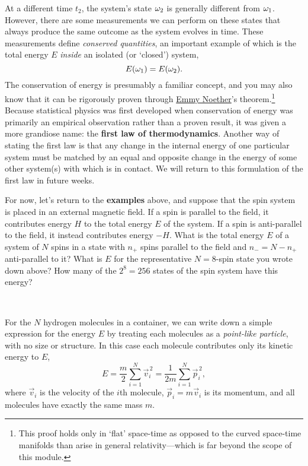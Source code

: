 At a different time $t_2$, the system's state $\omega_2$ is generally different from $\omega_1$.
However, there are some measurements we can perform on these states that always produce the same outcome as the system evolves in time.
These measurements define \textit{conserved quantities}, an important example of which is the total energy $E$ \textit{inside} an isolated (or `closed') system,
\begin{equation*}
  E(\omega_1) = E(\omega_2).
\end{equation*}
The conservation of energy is presumably a familiar concept, and you may also know that it can be rigorously proven through \href{https://en.wikipedia.org/wiki/Emmy_Noether}{Emmy Noether}'s theorem.\footnote{This proof holds only in `flat' space-time as opposed to the curved space-time manifolds than arise in general relativity---which is far beyond the scope of this module.}
Because statistical physics was first developed when conservation of energy was primarily an empirical observation rather than a proven result, it was given a more grandiose name: the \textbf{first law of thermodynamics}.
Another way of stating the first law is that any change in the internal energy of one particular system \Om must be matched by an equal and opposite change in the energy of some other system(s) with which \Om is in contact.
We will return to this formulation of the first law in future weeks.

For now, let's return to the \textbf{examples} above, and suppose that the spin system is placed in an external magnetic field.
If a spin is parallel to the field, it contributes energy $H$ to the total energy $E$ of the system.
If a spin is anti-parallel to the field, it instead contributes energy $-H$.
What is the total energy $E$ of a system of $N$ spins in a state with $n_+$ spins parallel to the field and $n_- = N - n_+$ anti-parallel to it?
What is $E$ for the representative $N = 8$-spin state you wrote down above?
How many of the $2^8 = 256$ states of the spin system have this energy?
\begin{mdframed}
  \ \\[100 pt]
\end{mdframed}
For the $N$ hydrogen molecules in a container, we can write down a simple expression for the energy $E$ by treating each molecules as a \textit{point-like particle}, with no size or structure.
In this case each molecule contributes only its kinetic energy to $E$,
\begin{equation*}
  E = \frac{m}{2} \sum_{i = 1}^N \vec{v}_i^{\,2} = \frac{1}{2m} \sum_{i = 1}^N \vec{p}_i^{\,2},
\end{equation*}
where $\vec v_i$ is the velocity of the $i$th molecule, $\vec p_i = m \vec v_i$ is its momentum, and all molecules have exactly the same mass $m$.

